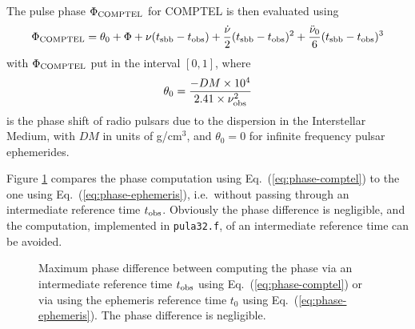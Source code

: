 \documentclass{article}[12pt,a4]
\begin{document}
The pulse phase $\Phi_{\rm COMPTEL}$ for COMPTEL is then evaluated using
\begin{equation}
\Phi_{\rm COMPTEL} = \theta_0 + \Phi + \nu (t_{\rm sbb} - t_{\rm obs}) + \frac{\dot{\nu}}{2} (t_{\rm sbb} - t_{\rm obs})^2 + \frac{\ddot{\nu}_0}{6} (t_{\rm sbb} - t_{\rm obs})^3
\label{eq:phase-comptel}
\end{equation}
with $\Phi_{\rm COMPTEL}$ put in the interval $[0,1]$, where 
\begin{equation}
\theta_0 = \frac{-DM \times 10^{4}}{2.41 \times \nu_{\rm obs}^2}
\end{equation}
is the phase shift of radio pulsars due to the dispersion in the Interstellar Medium, with $DM$ in units of g/cm$^3$,
and $\theta_0=0$ for infinite frequency pulsar ephemerides.

Figure \ref{fig:pulsar-phase} compares the phase computation using Eq.~(\ref{eq:phase-comptel}) to the one using
Eq.~(\ref{eq:phase-ephemeris}), i.e.~without passing through an intermediate reference time $t_{\rm obs}$.
Obviously the phase difference is negligible, and the computation, implemented in {\tt pula32.f}, of an intermediate
reference time can be avoided.

\begin{figure}[!t]
\center
{}
\caption{Maximum phase difference between computing the phase via an intermediate 
reference time $t_{\rm obs}$ using Eq.~(\ref{eq:phase-comptel}) or via using the ephemeris 
reference time $t_0$ using Eq.~(\ref{eq:phase-ephemeris}). The phase difference is negligible.}
\label{fig:pulsar-phase}
\end{figure}
\end{document}
